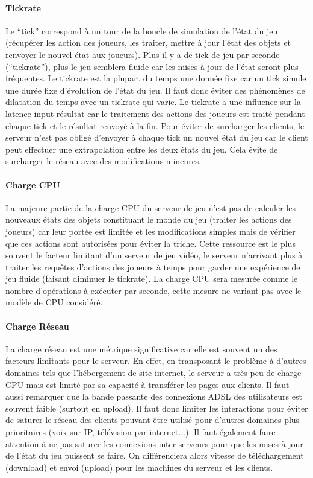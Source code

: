 \paragraph{Tickrate\\}
Le ``tick'' correspond à un tour de la boucle de simulation de l'état du jeu (récupérer les action des joueurs, les traiter, mettre à jour l'état des objets et renvoyer le nouvel état aux joueurs).
Plus il y a de tick de jeu par seconde (``tickrate''), plus le jeu semblera fluide car les mises à jour de l'état seront plus fréquentes.
Le tickrate est la plupart du temps une donnée fixe car un tick simule une durée fixe d'évolution de l'état du jeu.
Il faut donc éviter des phénomènes de dilatation du temps avec un tickrate qui varie.
Le tickrate a une influence sur la latence input-résultat car le traitement des actions des joueurs est traité pendant chaque tick et le résultat renvoyé à la fin.
Pour éviter de surcharger les clients, le serveur n'est pas obligé d'envoyer à chaque tick un nouvel état du jeu car le client peut effectuer une extrapolation entre les deux états du jeu.
Cela évite de surcharger le réseau avec des modifications mineures.

\paragraph{Charge CPU\\}
La majeure partie de la charge CPU du serveur de jeu n'est pas de calculer les nouveaux états des objets constituant le monde du jeu (traiter les actions des joueurs) car leur portée est limitée et les modifications simples mais de vérifier que ces actions sont autorisées pour éviter la triche.
Cette ressource est le plus souvent le facteur limitant d'un serveur de jeu vidéo, le serveur n'arrivant plus à traiter les requêtes d'actions des joueurs à temps pour garder une expérience de jeu fluide (faisant diminuer le tickrate).
La charge CPU sera mesurée comme le nombre d'opérations à exécuter par seconde, cette mesure ne variant pas avec le modèle de CPU considéré.

\paragraph{Charge Réseau\\}
La charge réseau est une métrique significative car elle est souvent un des facteurs limitants pour le serveur.
En effet, en transposant le problème à d'autres domaines tels que l'hébergement de site internet, le serveur a très peu de charge CPU mais est limité par sa capacité à transférer les pages aux clients.
Il faut aussi remarquer que la bande passante des connexions ADSL des utilisateurs est souvent faible (surtout en upload).
Il faut donc limiter les interactions pour éviter de saturer le réseau des clients pouvant être utilisé pour d'autres domaines plus prioritaires (voix sur IP, télévision par internet...).
Il faut également faire attention à ne pas saturer les connexions inter-serveurs pour que les mises à jour de l'état du jeu puissent se faire.
On différenciera alors vitesse de téléchargement (download) et envoi (upload) pour les machines du serveur et les clients.

